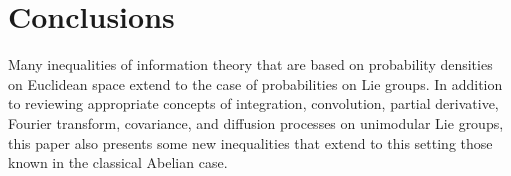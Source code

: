 \documentclass{svmult}
\begin{document}
%
%

\section{Conclusions}

Many inequalities of information theory that are based on probability densities on Euclidean space extend to the case of probabilities on
Lie groups. In addition to reviewing appropriate concepts of integration, convolution, partial derivative, Fourier transform, covariance, and diffusion processes on unimodular Lie groups, this paper also presents some new
inequalities that extend to this setting those known in the classical
Abelian case.
\end{document}
